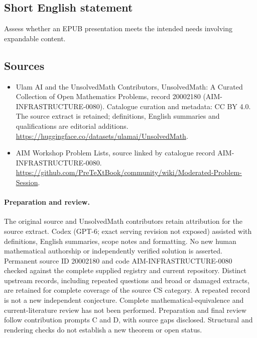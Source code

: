 \documentclass[11pt]{article}
\begin{document}
\subsection{Short English statement}
Assess whether an EPUB presentation meets the intended needs involving expandable content.
\subsection{Sources}
\begin{itemize}
\item[\hypertarget{source:20002180:1}{S1}] Ulam AI and the UnsolvedMath Contributors, UnsolvedMath: A Curated Collection of Open Mathematics Problems, record 20002180 (AIM-INFRASTRUCTURE-0080). Catalogue curation and metadata: CC BY 4.0. The source extract is retained; definitions, English summaries and qualifications are editorial additions.
\url{https://huggingface.co/datasets/ulamai/UnsolvedMath}.
\item[\hypertarget{source:20002180:2}{S2}] AIM Workshop Problem Lists, source linked by catalogue record AIM-INFRASTRUCTURE-0080.
\url{https://github.com/PreTeXtBook/community/wiki/Moderated-Problem-Session}.
\end{itemize}
\paragraph{Preparation and review.}
The original source and UnsolvedMath contributors retain attribution for the source extract. Codex (GPT-6; exact serving revision not exposed) assisted with definitions, English summaries, scope notes and formatting. No new human mathematical authorship or independently verified solution is asserted. Permanent source ID 20002180 and code AIM-INFRASTRUCTURE-0080 checked against the complete supplied registry and current repository. Distinct upstream records, including repeated questions and broad or damaged extracts, are retained for complete coverage of the source CS category. A repeated record is not a new independent conjecture. Complete mathematical-equivalence and current-literature review has not been performed. Preparation and final review follow contribution prompts C and D, with source gaps disclosed. Structural and rendering checks do not establish a new theorem or open status.
\label{end:20002180}
\end{document}
